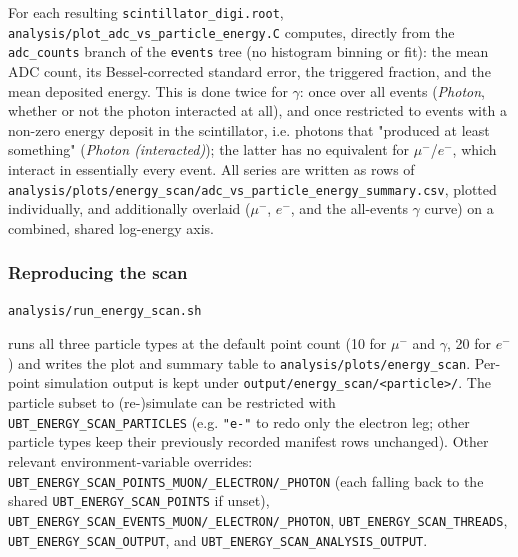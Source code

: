For each resulting \texttt{scintillator\_digi.root},
\texttt{analysis/plot\_adc\_vs\_particle\_energy.C} computes, directly from
the \texttt{adc\_counts} branch of the \texttt{events} tree (no histogram
binning or fit): the mean ADC count, its Bessel-corrected standard error,
the triggered fraction, and the mean deposited energy. This is done twice
for $\gamma$: once over all events (\emph{Photon}, whether or not the
photon interacted at all), and once restricted to events with a non-zero
energy deposit in the scintillator, i.e. photons that "produced at least
something" (\emph{Photon (interacted)}); the latter has no equivalent for
$\mu^-$/$e^-$, which interact in essentially every event. All series are
written as rows of
\texttt{analysis/plots/energy\_scan/adc\_vs\_particle\_energy\_summary.csv},
plotted individually, and additionally overlaid ($\mu^-$, $e^-$, and the
all-events $\gamma$ curve) on a combined, shared log-energy axis.

\subsubsection{Reproducing the scan}
\begin{technicaldetails}
\begin{verbatim}
analysis/run_energy_scan.sh
\end{verbatim}
runs all three particle types at the default point count (10 for $\mu^-$
and $\gamma$, 20 for $e^-$) and writes the plot and summary table to
\texttt{analysis/plots/energy\_scan}. Per-point simulation output is kept
under \texttt{output/energy\_scan/<particle>/}. The particle subset to
(re-)simulate can be restricted with \texttt{UBT\_ENERGY\_SCAN\_PARTICLES}
(e.g. \texttt{"e-"} to redo only the electron leg; other particle types keep
their previously recorded manifest rows unchanged). Other relevant
environment-variable overrides:
\texttt{UBT\_ENERGY\_SCAN\_POINTS\_MUON/\_ELECTRON/\_PHOTON} (each falling
back to the shared \texttt{UBT\_ENERGY\_SCAN\_POINTS} if unset),
\texttt{UBT\_ENERGY\_SCAN\_EVENTS\_MUON/\_ELECTRON/\_PHOTON},
\texttt{UBT\_ENERGY\_SCAN\_THREADS}, \texttt{UBT\_ENERGY\_SCAN\_OUTPUT}, and
\texttt{UBT\_ENERGY\_SCAN\_ANALYSIS\_OUTPUT}.
\end{technicaldetails}

